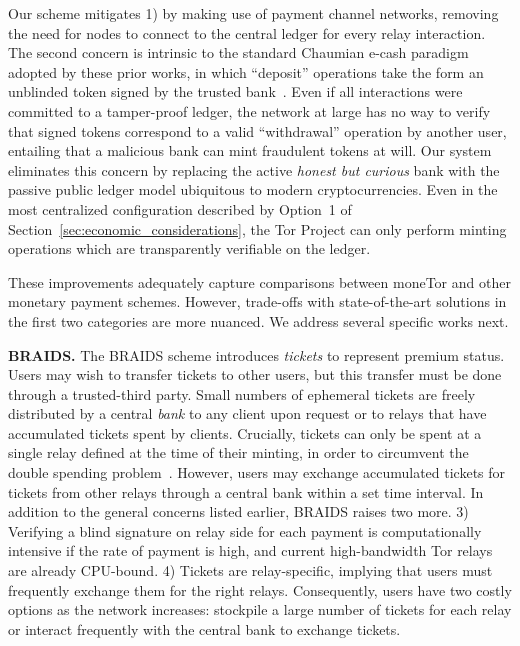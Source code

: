 Our scheme mitigates 1) by making use of payment channel networks, removing the need for nodes to connect to the central ledger for every relay interaction.
The second concern is intrinsic to the standard Chaumian e-cash paradigm adopted by these prior works, in which ``deposit'' operations take the form an unblinded token signed by the trusted bank~\cite{chaum1988untraceable}.
Even if all interactions were committed to a tamper-proof ledger, the network at large has no way to verify that signed tokens correspond to a valid ``withdrawal'' operation by another user, entailing that a malicious bank can mint fraudulent tokens at will.
Our system eliminates this concern by replacing the active \emph{honest but curious} bank with the passive public ledger model ubiquitous to modern cryptocurrencies.
Even in the most centralized configuration described by Option~1 of Section~\ref{sec:economic_considerations}, the Tor Project can only perform minting operations which are transparently verifiable on the ledger.

These improvements adequately capture comparisons between moneTor and other monetary payment schemes.
However, trade-offs with state-of-the-art solutions in the first two categories are more nuanced.
We address several specific works next.

\medskip\noindent\textbf{BRAIDS.}
The BRAIDS scheme introduces \emph{tickets} to represent premium status.
Users may wish to transfer tickets to other users, but this transfer must be done through a trusted-third party.
Small numbers of ephemeral tickets are freely distributed by a central \emph{bank} to any client upon request or to relays that have accumulated tickets spent by clients.
Crucially, tickets can only be spent at a single relay defined at the time of their minting, in order to circumvent the double spending problem~\cite{jansen2010recruiting}.
However, users may exchange accumulated tickets for tickets from other relays through a central bank within a set time interval.
In addition to the general concerns listed earlier, BRAIDS raises two more.
3) Verifying a blind signature on relay side for each payment is computationally intensive if the rate of payment is high, and current high-bandwidth Tor relays are already CPU-bound.
4) Tickets are relay-specific, implying that users must frequently exchange them for the right relays.
Consequently, users have two costly options as the network increases: stockpile a large number of tickets for each relay or interact frequently with the central bank to exchange tickets.

